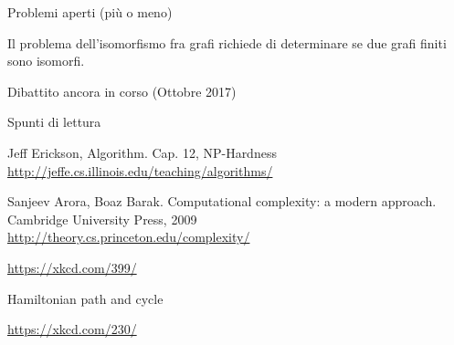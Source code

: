 \begin{frame}{Problemi aperti (più o meno)}

\vspace{-9pt}
\begin{myboxtitle}
Il problema dell'isomorfismo fra grafi richiede di determinare se due
grafi finiti sono isomorfi.
\BI
\item {}
\item Dibattito ancora in corso (Ottobre 2017)
\EI
\end{myboxtitle}

\vspace{-3pt}
\end{frame}


\begin{frame}{Spunti di lettura}

\vspace{-9pt}
\begin{myboxtitle}[Bibliografia]
\BI
\item Jeff Erickson, Algorithm. Cap. 12, NP-Hardness\\
\url{http://jeffe.cs.illinois.edu/teaching/algorithms/}
\item Sanjeev Arora, Boaz Barak. Computational complexity: a modern approach.
Cambridge University Press, 2009\\
\url{http://theory.cs.princeton.edu/complexity/}
\EI
\end{myboxtitle}


\vfill
\tiny
\url{https://xkcd.com/399/}

\end{frame}

\begin{OnlySlides}{Hamiltonian path and cycle}
\vspace{-12pt}
\begin{center}
\end{center}
\vfill
\tiny
\url{https://xkcd.com/230/}
\end{OnlySlides}












